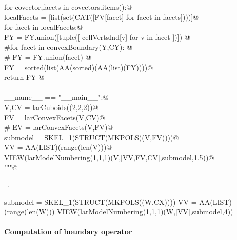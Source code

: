 \documentclass[11pt,oneside]{article}	%
\begin{document}
\begin{flushleft}
\begin{list}{}{}
\mbox{}\verb@      for covector,facets in covectors.items():@\\
\mbox{}\verb@         localFacets = [list(set(CAT([FV[facet] for facet in facets])))]@\\
\mbox{}\verb@         for facet in localFacets:@\\
\mbox{}\verb@            FY = FY.union([tuple([ cellVertsInd[v] for v in facet ])])  @\\
\mbox{}\verb@   #for facet in convexBoundary(Y,CY):       @\\
\mbox{}\verb@   #  FY = FY.union(facet) @\\
\mbox{}\verb@   FY = sorted(list(AA(sorted)(AA(list)(FY))))@\\
\mbox{}\verb@   return FY   @\\
\mbox{}\verb@@\\
\mbox{}\verb@if __name__ == "__main__":@\\
\mbox{}\verb@    V,CV = larCuboids((2,2,2))@\\
\mbox{}\verb@    FV = larConvexFacets(V,CV)@\\
\mbox{}\verb@    # EV = larConvexFacets(V,FV)@\\
\mbox{}\verb@    submodel = SKEL_1(STRUCT(MKPOLS((V,FV))))@\\
\mbox{}\verb@    VV = AA(LIST)(range(len(V)))@\\
\mbox{}\verb@    VIEW(larModelNumbering(1,1,1)(V,[VV,FV,CV],submodel,1.5))@\\
\mbox{}\verb@"""@\\
\mbox{}\verb@@{\NWsep}
\end{list}
\vspace{-1ex}
\footnotesize\addtolength{\baselineskip}{-1ex}
\begin{list}{}{\setlength{\itemsep}{-\parsep}\setlength{\itemindent}{-\leftmargin}}
\item \NWtxtMacroRefIn\ .
\end{list}
\end{flushleft}

submodel = SKEL_1(STRUCT(MKPOLS((W,CX))))
VV = AA(LIST)(range(len(W)))
VIEW(larModelNumbering(1,1,1)(W,[VV],submodel,4))


\paragraph{Computation of boundary operator}
\end{document}
